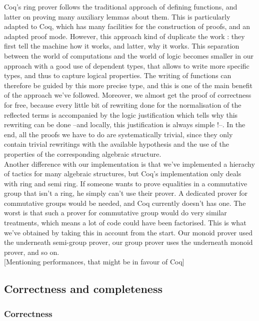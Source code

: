 Coq's ring prover follows the traditional approach of defining functions, and latter on proving many auxiliary lemmas about them. This is particularly adapted to Coq, which has many facilities for the construction of proofs, and an adapted proof mode. However, this approach kind of duplicate the work : they first tell the machine how it works, and latter, why it works. This separation between the world of computations and the world of logic becomes smaller in our approach with a good use of dependent types, that allows to write more specific types, and thus to capture logical properties. The writing of functions can therefore be guided by this more precise type, and this is one of the main benefit of the approach we've followed. Moreover, we almost get the proof of correctness for free, because every little bit of rewriting done for the normalisation of the reflected terms is accompanied by the logic justification which tells why this rewriting can be done --and locally, this justification is always simple !--. In the end, all the proofs we have to do are systematically trivial, since they only contain trivial rewritings with the available hypothesis and the use of the properties of the corresponding algebraic structure. \\

Another difference with our implementation is that we've implemented a hierachy of tactics for many algebraic structures, but Coq's implementation only deals with ring and semi ring. If someone wants to prove equalities in a commutative group that isn't a ring, he simply can't use their prover. A dedicated prover for commutative groups would be needed, and Coq currently doesn't has one. The worst is that such a prover for commutative group would do very similar treatments, which means a lot of code could have been factorised. This is what we've obtained by taking this in account from the start. Our monoid prover used the underneath semi-group prover, our group prover uses the underneath monoid prover, and so on. \\

[Mentioning performances, that might be in favour of Coq]

	\subsection {Correctness and completeness}

		\subsubsection{Correctness}
		
